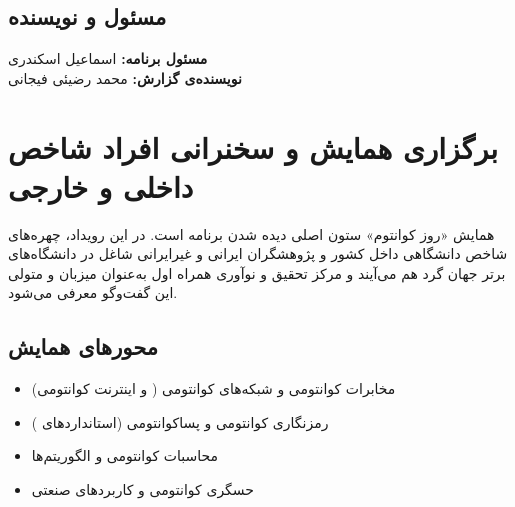\documentclass[a4paper,12pt]{article}
\begin{document}
	\begin{center}
	\end{center}

	\subsection*{مسئول و نویسنده}
	\textbf{مسئول برنامه:} اسماعیل اسکندری \\
	\textbf{نویسنده‌ی گزارش:} محمد رضیئی فیجانی


	\newpage
	\section{برگزاری همایش و سخنرانی افراد شاخص داخلی و خارجی}

	همایش «روز کوانتوم» ستون اصلی دیده شدن برنامه است.
	در این رویداد، چهره‌های شاخص دانشگاهی داخل کشور و پژوهشگران ایرانی و غیرایرانی
	شاغل در دانشگاه‌های برتر جهان گرد هم می‌آیند و مرکز تحقیق و نوآوری همراه اول
	به‌عنوان میزبان و متولی این گفت‌وگو معرفی می‌شود.

	\subsection{محورهای همایش}
	\begin{itemize}[rightmargin=0.5cm, itemsep=4pt]
		\item مخابرات کوانتومی و شبکه‌های کوانتومی ( و اینترنت کوانتومی)
		\item رمزنگاری کوانتومی و پساکوانتومی (استانداردهای )
		\item محاسبات کوانتومی و الگوریتم‌ها
		\item حسگری کوانتومی و کاربردهای صنعتی
	\end{itemize}
\end{document}
